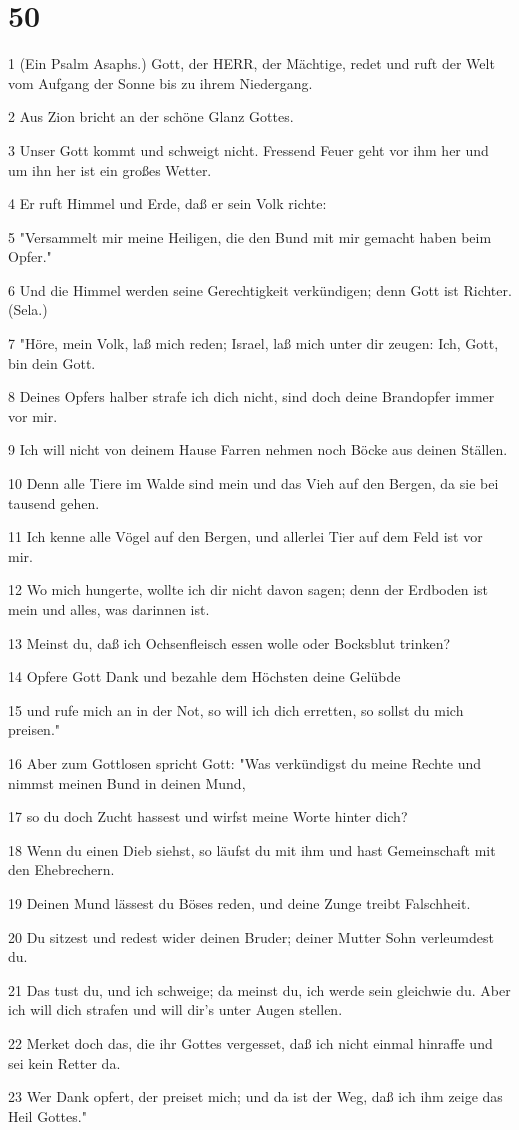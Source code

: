 \chapter{50}

\par 1 (Ein Psalm Asaphs.) Gott, der HERR, der Mächtige, redet und ruft der Welt vom Aufgang der Sonne bis zu ihrem Niedergang.
\par 2 Aus Zion bricht an der schöne Glanz Gottes.
\par 3 Unser Gott kommt und schweigt nicht. Fressend Feuer geht vor ihm her und um ihn her ist ein großes Wetter.
\par 4 Er ruft Himmel und Erde, daß er sein Volk richte:
\par 5 "Versammelt mir meine Heiligen, die den Bund mit mir gemacht haben beim Opfer."
\par 6 Und die Himmel werden seine Gerechtigkeit verkündigen; denn Gott ist Richter. (Sela.)
\par 7 "Höre, mein Volk, laß mich reden; Israel, laß mich unter dir zeugen: Ich, Gott, bin dein Gott.
\par 8 Deines Opfers halber strafe ich dich nicht, sind doch deine Brandopfer immer vor mir.
\par 9 Ich will nicht von deinem Hause Farren nehmen noch Böcke aus deinen Ställen.
\par 10 Denn alle Tiere im Walde sind mein und das Vieh auf den Bergen, da sie bei tausend gehen.
\par 11 Ich kenne alle Vögel auf den Bergen, und allerlei Tier auf dem Feld ist vor mir.
\par 12 Wo mich hungerte, wollte ich dir nicht davon sagen; denn der Erdboden ist mein und alles, was darinnen ist.
\par 13 Meinst du, daß ich Ochsenfleisch essen wolle oder Bocksblut trinken?
\par 14 Opfere Gott Dank und bezahle dem Höchsten deine Gelübde
\par 15 und rufe mich an in der Not, so will ich dich erretten, so sollst du mich preisen."
\par 16 Aber zum Gottlosen spricht Gott: "Was verkündigst du meine Rechte und nimmst meinen Bund in deinen Mund,
\par 17 so du doch Zucht hassest und wirfst meine Worte hinter dich?
\par 18 Wenn du einen Dieb siehst, so läufst du mit ihm und hast Gemeinschaft mit den Ehebrechern.
\par 19 Deinen Mund lässest du Böses reden, und deine Zunge treibt Falschheit.
\par 20 Du sitzest und redest wider deinen Bruder; deiner Mutter Sohn verleumdest du.
\par 21 Das tust du, und ich schweige; da meinst du, ich werde sein gleichwie du. Aber ich will dich strafen und will dir's unter Augen stellen.
\par 22 Merket doch das, die ihr Gottes vergesset, daß ich nicht einmal hinraffe und sei kein Retter da.
\par 23 Wer Dank opfert, der preiset mich; und da ist der Weg, daß ich ihm zeige das Heil Gottes."

